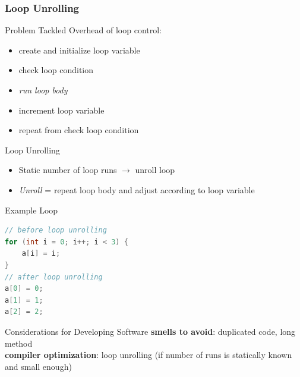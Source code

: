 \begin{frame}[fragile]
	\frametitle{Loop Unrolling}
	\begin{fancycolumns}
		\begin{motivation}{Problem Tackled}
			Overhead of loop control:
			\begin{itemize}
				\item create and initialize loop variable
				\item check loop condition
				\item \emph{run loop body}
				\item increment loop variable
				\item repeat from check loop condition
			\end{itemize}

		\end{motivation}
		\begin{definition}{{Loop Unrolling}}
			\begin{itemize}
				\item Static number of loop runs $\rightarrow$ unroll loop
				\item \emph{Unroll} = repeat loop body and adjust according to loop variable
			\end{itemize}
		\end{definition}
		\nextcolumn
		\begin{example}{Example Loop}
			\begin{lstlisting}[language=Java,basicstyle=\normalsize]
// before loop unrolling
for (int i = 0; i++; i < 3) { 
	a[i] = i; 
}
// after loop unrolling
a[0] = 0; 
a[1] = 1; 
a[2] = 2;
			\end{lstlisting}
		\end{example}
		\begin{note}{Considerations for Developing Software}
			\textbf{smells to avoid}: duplicated code, long method\\\textbf{compiler optimization}: loop unrolling (if number of runs is statically known and small enough)
		\end{note}
	\end{fancycolumns}
\end{frame}

